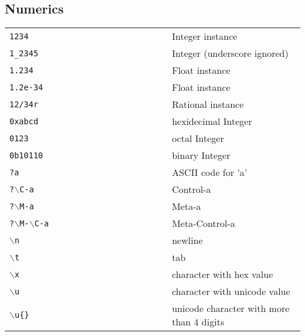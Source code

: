 \documentclass[6pt]{article}
\begin{document}
\begin{multicols}{3}
  \subsection{Numerics}
  \begin{tabular}{L{0.55\linewidth} L{0.45\linewidth}}
    \tt 1234                           & Integer instance                          \\
    \tt 1\_2345                        & Integer (underscore ignored)              \\
    \tt 1.234                          & Float instance                            \\
    \tt 1.2e-34                        & Float instance                            \\
    \tt 12/34r                         & Rational instance                         \\
    \tt 0xabcd                         & hexidecimal Integer                       \\
    \tt 0123                           & octal Integer                             \\
    \tt 0b10110                        & binary Integer                            \\
    \tt ?a                             & ASCII code for 'a'                        \\
    \tt ?$\backslash$C-a               & Control-a                                 \\
    \tt ?$\backslash$M-a               & Meta-a                                    \\
    \tt ?$\backslash$M-$\backslash$C-a & Meta-Control-a                            \\
    \tt $\backslash$n                  & newline                                   \\
    \tt $\backslash$t                  & tab                                       \\
    \tt $\backslash$x          & character with hex value          \\
    \tt $\backslash$u        & character with unicode value    \\
    \tt $\backslash$u\{\}   & unicode character with more than 4 digits \\
  \end{tabular}

\end{multicols}
\end{document}
